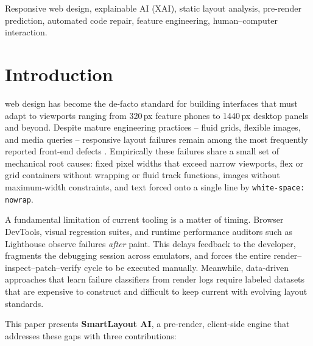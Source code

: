\documentclass[conference]{IEEEtran}
\begin{document}
\begin{IEEEkeywords}
Responsive web design, explainable AI (XAI), static layout analysis,
pre-render prediction, automated code repair, feature engineering,
human--computer interaction.
\end{IEEEkeywords}

\section{Introduction}
 web design \cite{marcotte2011responsive} has
become the de-facto standard for building interfaces that must adapt to
viewports ranging from 320\,px feature phones to 1440\,px desktop panels
and beyond. Despite mature engineering practices -- fluid grids, flexible
images, and media queries -- responsive layout failures remain among the
most frequently reported front-end defects \cite{webalmanac2022}.
Empirically these failures share a small set of mechanical root causes:
fixed pixel widths that exceed narrow viewports, flex or grid containers
without wrapping or fluid track functions, images without maximum-width
constraints, and text forced onto a single line by \texttt{white-space:
nowrap}.

A fundamental limitation of current tooling is a matter of timing.
Browser DevTools, visual regression suites, and runtime performance
auditors such as Lighthouse \cite{lighthouse2022} observe failures
\textit{after} paint. This delays feedback to the developer, fragments
the debugging session across emulators, and forces the entire
render--inspect--patch--verify cycle to be executed manually. Meanwhile,
data-driven approaches that learn failure classifiers from render logs
require labeled datasets that are expensive to construct and difficult to
keep current with evolving layout standards.

This paper presents \textbf{SmartLayout AI}, a pre-render, client-side
engine that addresses these gaps with three contributions:
\end{document}
